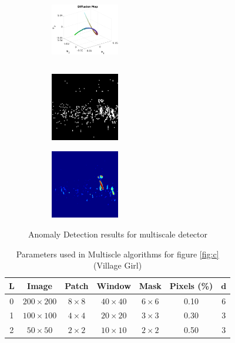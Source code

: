 \begin{figure}[t!]
\medskip
\begin{subfigure}{0.32\textwidth}
\includegraphics[height=3cm,width=3cm]{./Figures/girl/3.png}
\caption{}
\end{subfigure}\hspace*{\fill}
\begin{subfigure}{0.32\textwidth}
\includegraphics[height=3cm,width=3cm]{./Figures/girl/5.png}
\caption{} 
\end{subfigure}
\begin{subfigure}{0.32\textwidth}
\includegraphics[height=3cm,width=3cm]{./Figures/girl/6.png}
\caption{} 
\end{subfigure}

\caption{Anomaly Detection results for multiscale detector} \label{R:girl}
\end{figure}

\begin{table}
\caption{Parameters used in Multiscle algorithms for figure \ref{fig:c} (Village Girl)}
\begin{center}
 \begin{tabular}{c c c c c c c} 
  \hline\hline 
 $\mathbf{L}$ & Image & Patch & Window & Mask & Pixels (\%) & $\mathbf{d}$\\ [0.5ex]   
 \hline
 0 & $200\times200$ & $8\times8$ & $40\times40$ & $6\times6$ & 0.10 & 6 \\ 
 
 1 & $100\times100$ & $4\times4$ & $20\times20$ & $3\times3$ & 0.30 & 3 \\
 
 2 & $50\times50$ & $2\times2$ & $10\times10$ & $2\times2$ & 0.50 & 3 \\ [1ex] 
\hline
\end{tabular}
\end{center}
\label{T:girl}
\end{table}

